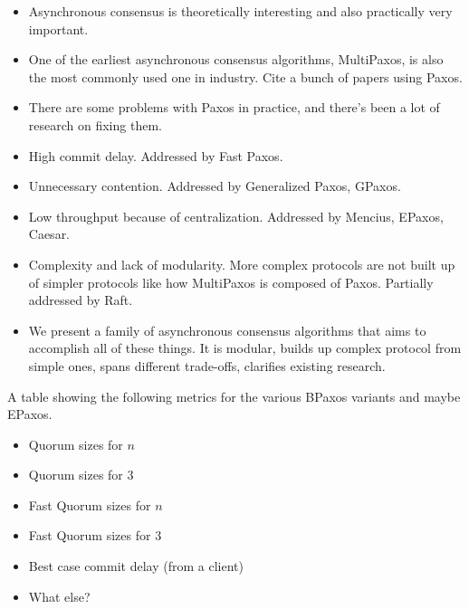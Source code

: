 
\begin{itemize}
  \item
    Asynchronous consensus is theoretically interesting and also practically
    very important.

  \item
    One of the earliest asynchronous consensus algorithms, MultiPaxos, is also
    the most commonly used one in industry. Cite a bunch of papers using Paxos.

  \item
    There are some problems with Paxos in practice, and there's been a lot of
    research on fixing them.

  \item
    High commit delay. Addressed by Fast Paxos.

  \item
    Unnecessary contention. Addressed by Generalized Paxos, GPaxos.

  \item
    Low throughput because of centralization. Addressed by Mencius, EPaxos,
    Caesar.

  \item
    Complexity and lack of modularity. More complex protocols are not built up
    of simpler protocols like how MultiPaxos is composed of Paxos. Partially
    addressed by Raft.

  \item
    We present a family of asynchronous consensus algorithms that aims to
    accomplish all of these things. It is modular, builds up complex protocol
    from simple ones, spans different trade-offs, clarifies existing research.
\end{itemize}

A table showing the following metrics for the various BPaxos variants and maybe
EPaxos.
\begin{itemize}
  \item Quorum sizes for $n$
  \item Quorum sizes for $3$
  \item Fast Quorum sizes for $n$
  \item Fast Quorum sizes for $3$
  \item Best case commit delay (from a client)
  \item What else?
\end{itemize}
